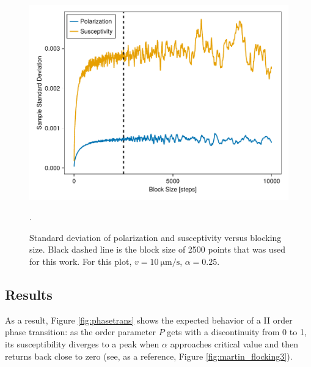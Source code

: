 \documentclass[../../master_thesis_np.tex]{subfiles}
\begin{document}
		\begin{figure}[hbtp]
			\centering
			\includegraphics[width= \singfigwidth]{phasetrans/blocksize_v10.pdf}
			\caption{Standard deviation of polarization and susceptivity versus blocking size. Black dashed line is the block size of 2500 points that was used for this work. For this plot, $v = \SI{10}{\um\per\second}$, $\alpha = 0.25$.}.
			\label{fig:blocksize}
		\end{figure}


		
		\subsection{Results}
		As a result, Figure \ref{fig:phasetrans} shows the expected behavior of a II order phase transition: as the order parameter $P$ gets with a discontinuity from 0 to 1, its susceptibility diverges to a peak when $\alpha$ approaches critical value and then returns back close to zero (see, as a reference, Figure \ref{fig:martin_flocking3}).
		
\end{document}
